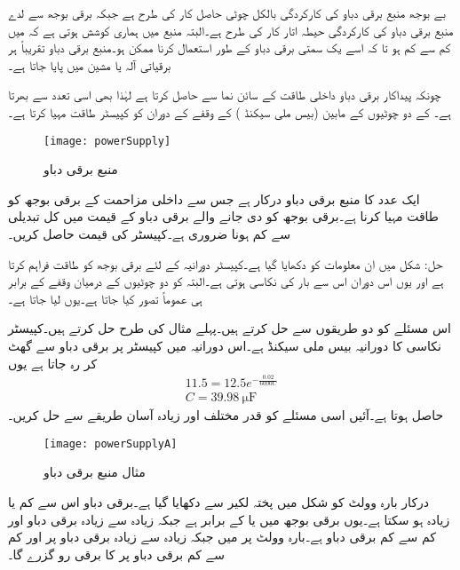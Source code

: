 بے بوجھ منبع برقی دباو کی کارکردگی بالکل چوٹی حاصل کار کی طرح ہے جبکہ برقی بوجھ سے لدے منبع برقی دباو کی کارکردگی حیطہ اتار کار کی طرح ہے۔البتہ منبع میں ہماری کوشش ہوتی ہے کہ   میں  کم سے کم ہو تا کہ اسے یک سمتی برقی دباو کے طور استعمال کرنا ممکن ہو۔منبع برقی دباو تقریباً ہر برقیاتی آلہ یا مشین میں پایا جاتا ہے۔

چونکہ پیداکار برقی دباو داخلی طاقت  کے سائن نما  سے حاصل کرتا ہے لہٰذا  بھی اسی تعدد سے بھرتا ہے۔ کے دو چوٹیوں کے مابین   (بیس ملی سیکنڈ )  کے وقفے  کے دوران  کو کپیسٹر  طاقت مہیا کرتا ہے۔
\begin{figure}
\centering
\texttt{[image: powerSupply]}
\caption{منبع برقی دباو}
\label{شکل_پاور_منبع}
\end{figure}
 
ایک عدد  کا منبع برقی دباو درکار ہے جس سے  داخلی مزاحمت کے برقی بوجھ کو طاقت مہیا کرنا ہے۔برقی بوجھ کو دی جانے والے برقی دباو کے قیمت میں کل تبدیلی  سے کم ہونا ضروری ہے۔کپیسٹر  کی قیمت حاصل کریں۔

حل: 
شکل  میں ان معلومات کو دکھایا گیا ہے۔کپیسٹر  دورانیہ کے لئے  برقی بوجھ کو طاقت فراہم کرتا ہے اور یوں اس دوران اس سے بار کی نکاسی ہوتی ہے۔البتہ  کو دو چوٹیوں کے درمیان وقفے کے برابر ہی عموماً تصور کیا جاتا ہے۔یوں  لیا جاتا ہے۔

اس مسئلے کو دو طریقوں سے حل کرتے ہیں۔پہلے مثال  کی طرح حل کرتے ہیں۔کپیسٹر نکاسی  کا دورانیہ بیس ملی سیکنڈ ہے۔اس دورانیہ میں  کپیسٹر پر  برقی دباو  سے گھٹ کر  رہ جاتا ہے یوں
\begin{align*}
11.5=12.5 e^{-\frac{0.02}{6000C}}\\
C=\SI{39.98}{\micro \farad}
\end{align*}
حاصل ہوتا ہے۔آئیں اسی مسئلے کو قدر مختلف اور زیادہ آسان طریقے سے حل کریں۔
% 
 \begin{figure}
\centering
\texttt{[image: powerSupplyA]}
\caption{مثال منبع برقی دباو}
\label{شکل_مثال_پاور_منبع}
\end{figure}

درکار بارہ وولٹ کو شکل  میں پختہ لکیر سے دکھایا گیا ہے۔برقی دباو اس سے  کم یا زیادہ ہو سکتا ہے۔یوں برقی بوجھ میں   یا  کے برابر ہے جبکہ زیادہ سے زیادہ برقی دباو  اور کم سے کم برقی دباو  ہے۔بارہ وولٹ پر  میں  جبکہ زیادہ سے زیادہ برقی دباو پر   اور کم سے کم برقی دباو پر   کا برقی رو گزرے گا۔

